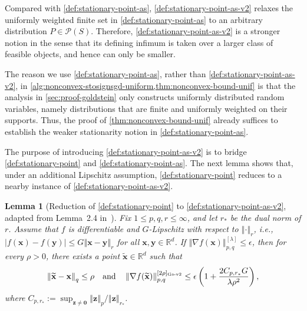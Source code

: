 \documentclass{article}
\newtheorem{lem}{Lemma}
\def \y {\mathbf{y}}
\def \x {\mathbf{x}}
\def \z {\mathbf{z}}
\def \R {\mathbb{R}}
\def \P {\mathcal{P}}
\def \xt {\widetilde{\x}}
\newcommand{\norm}[1]{\left\Vert#1\right\Vert}
\newcommand{\abs}[1]{\left|#1\right|}
\newcommand{\brac}[1]{\left(#1\right)}
\def\0{\bm{0}}
\begin{document}
Compared with \cref{def:stationary-point-as}, \cref{def:stationary-point-as-v2} relaxes the uniformly weighted finite set in \cref{def:stationary-point-as} to an arbitrary distribution $P\in\P(S)$. Therefore, \cref{def:stationary-point-as-v2} is a stronger notion in the sense that its defining infimum is taken over a larger class of feasible objects, and hence can only be smaller. 

The reason we use \cref{def:stationary-point-as}, rather than \cref{def:stationary-point-as-v2}, in \cref{alg:nonconvex-stosignsgd-uniform,thm:nonconvex-bound-unif} is that the analysis in \cref{sec:proof-goldstein} only constructs uniformly distributed random variables, namely distributions that are finite and uniformly weighted on their supports. Thus, the proof of \cref{thm:nonconvex-bound-unif} already suffices to establish the weaker stationarity notion in \cref{def:stationary-point-as}.

The purpose of introducing \cref{def:stationary-point-as-v2} is to bridge \cref{def:stationary-point} and \cref{def:stationary-point-as}. The next lemma shows that, under an additional Lipschitz assumption, \cref{def:stationary-point} reduces to a nearby instance of \cref{def:stationary-point-as-v2}.

\begin{lem}[Reduction of \cref{def:stationary-point} to \cref{def:stationary-point-as-v2}, adapted from Lemma~2.4 in~\citet{zhang2026random}]\label{lem:reduction}
Fix $1\le p,q,r\le\infty$, and let $r_*$ be the dual norm of $r$. Assume that $f$ is differentiable and $G$-Lipschitz with respect to $\norm{\cdot}_r$, i.e., $\abs{f(\x)-f(\y)}\le G\norm{\x-\y}_r$ for all $\x,\y\in\R^d$. If $\norm{\nabla f(\x)}_{p,q}^{[\lambda]}\le\epsilon$, then for every $\rho>0$, there exists a point $\xt\in\R^d$ such that
\begin{align*}
    \norm{\xt-\x}_q\le \rho
    \quad\text{and}\quad
    \norm{\nabla f(\xt)}_{p,q}^{[2\rho]_{\textnormal{Gs-v2}}}
    \le
    \epsilon\brac{1+\frac{2C_{p,r_*}G}{\lambda\rho^2}},
\end{align*}
where $C_{p,r_*}:=\sup_{\z\neq\0}\norm{\z}_p/\norm{\z}_{r_*}$.
\end{lem}
\end{document}
